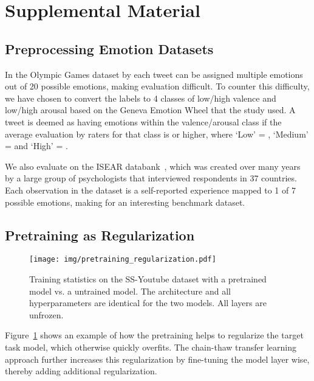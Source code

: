 \documentclass[11pt,a4paper]{article}
\begin{document}
\appendix

\section{Supplemental Material}
\label{sec:supplemental}

\subsection{Preprocessing Emotion Datasets}
\label{sub_sec:supp_emotion_dsets}

In the Olympic Games dataset by \citeauthor{sintsova2013fine} each tweet can be assigned multiple emotions out of 20 possible emotions, making evaluation difficult. To counter this difficulty, we have chosen to convert the labels to 4 classes of low/high valence and low/high arousal based on the Geneva Emotion Wheel that the study used. A tweet is deemed as having emotions within the valence/arousal class if the average evaluation by raters for that class is  or higher, where `Low' = , `Medium' =  and `High' = .

We also evaluate on the ISEAR databank~\cite{wallbott1986universal}, which was created over many years by a large group of psychologists that interviewed respondents in 37 countries. Each observation in the dataset is a self-reported experience mapped to 1 of 7 possible emotions, making for an interesting benchmark dataset.


\subsection{Pretraining as Regularization}

\begin{figure}[hpt]
  \centering
  \texttt{[image: img/pretraining\_regularization.pdf]}
  \caption{Training statistics on the SS-Youtube dataset with a pretrained model vs. a untrained model. The architecture and all hyperparameters are identical for the two models. All layers are unfrozen.}
  \label{fig:pretraining_regularization}
\end{figure}

Figure~\ref{fig:pretraining_regularization} shows an example of how the pretraining helps to regularize the target task model, which otherwise quickly overfits. The chain-thaw transfer learning approach further increases this regularization by fine-tuning the model layer wise, thereby adding additional regularization.
\end{document}
